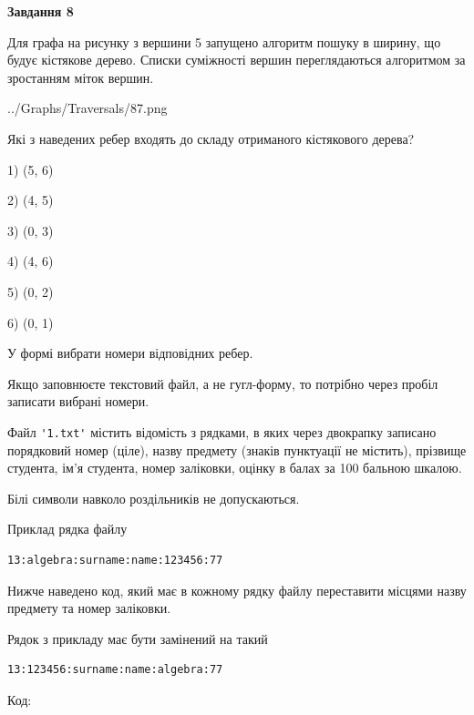 \documentclass[12pt, ukrainian]{article}
\def\code#1{\Verb!#1!}
\begin{document}
{\begin {large}
{\begin {center}\textbf{Завдання 8}\end {center}}\par
Для графа на рисунку з вершини 5 запущено алгоритм пошуку в ширину, що будує кістякове дерево. Списки суміжності вершин переглядаються алгоритмом за зростанням міток вершин.\par
\begin{center}
	{../Graphs/Traversals/87.png}
\end{center}
\par Які з наведених ребер входять до складу отриманого кістякового дерева?\par
1) (5, 6)\par
2) (4, 5)\par
3) (0, 3)\par
4) (4, 6)\par
5) (0, 2)\par
6) (0, 1)\par
{\vskip 15pt} У формі вибрати номери відповідних ребер.


Якщо заповнюєте текстовий файл, а не гугл-форму, то потрібно через пробіл записа\-ти вибрані номери.\par
\newpage


Файл \code{'1.txt'} містить відомість з рядками, в яких через двокрапку записано поряд\-ковий номер (ціле), назву предмету (знаків пунктуації не містить), прізвище студента, ім'я студента, номер заліковки, оцінку в балах за 100 бальною шкалою.

Білі символи навколо роздільників не допускаються.

Приклад рядка файлу



\begin{verbatim}
13:algebra:surname:name:123456:77
\end{verbatim}


Нижче наведено код, який має в кожному рядку файлу переставити місцями назву предмету та номер заліковки.

Рядок з прикладу має бути замінений на такий



\begin{verbatim}
13:123456:surname:name:algebra:77
\end{verbatim}




Код:




\end{large}}
\end{document}
